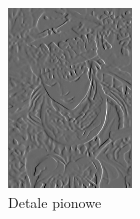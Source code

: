 \begin{figure}[ht]
\begin{minipage}[t]{0.3\linewidth}
        \includegraphics[width=\linewidth]{Rozdziały/02.Podstawy_teoretyczne/Obrazy/vertical_detail.png}
        \caption{Detale pionowe}
        \label{fig:image20}
    \end{minipage}
    \hspace{0.5cm}
    \begin{minipage}[t]{0.3\linewidth}

\end{minipage}
\end{figure}
